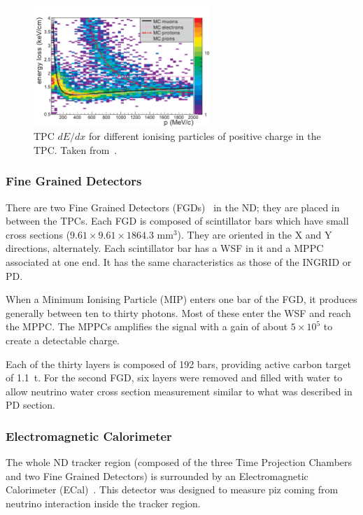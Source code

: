 \begin{figure}[ht]
  \center
  \includegraphics[width=0.6\textwidth]{images/t2k/dedx.pdf}
  \caption[TPC $dE/dx$ distributions for positively charged
  particles]{\Gls{TPC} $dE/dx$ for different ionising particles of
    positive charge in the \Gls{TPC}. Taken from~\cite{TPC}.}
  \label{fig:tpcdedx}
\end{figure}

\subsubsection{Fine Grained Detectors}
\label{subsubsec:fgd}
There are two Fine Grained Detectors (\Glspl{FGD})~\cite{FGD} in the
\Gls{ND}; they are placed in between the \Glspl{TPC}. Each \Gls{FGD}
is composed of scintillator bars which have small cross sections
($9.61 \times 9.61 \times 1864.3 \text{~mm}^3$). They are oriented in
the X and Y directions, alternately. Each scintillator bar has a
\Gls{WSF} in it and a \Gls{MPPC} associated at one end. It has the
same characteristics as those of the \Gls{INGRID} or \Gls{PD}.

When a Minimum Ionising Particle (\Gls{MIP}) enters one bar of the
\Gls{FGD}, it produces generally between ten to thirty photons. Most
of these enter the \Gls{WSF} and reach the \Gls{MPPC}. The
\Glspl{MPPC} amplifies the signal with a gain of about
$5\times 10^{5}$ to create a detectable charge.

Each of the thirty layers is composed of 192 bars, providing active
carbon target of 1.1~t. For the second \Gls{FGD}, six layers were
removed and filled with water to allow neutrino water cross section
measurement similar to what was described in \Gls{PD} section.

\subsubsection{Electromagnetic Calorimeter}
\label{subsubsec:ecal}
The whole \Gls{ND} tracker region (composed of the three Time
Projection Chambers and two Fine Grained Detectors) is surrounded by
an Electromagnetic Calorimeter (\Gls{ECal})~\cite{ECal}. This detector
was designed to measure \gls{piz} coming from neutrino interaction
inside the tracker region.

